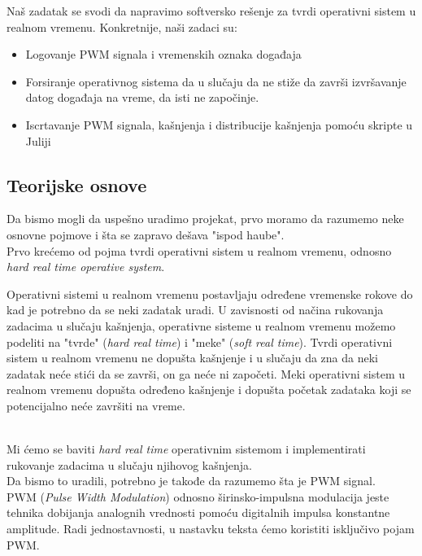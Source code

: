 \documentclass[a4paper, 11pt, titlepage]{article}
\begin{document}
Naš zadatak se svodi da napravimo softversko rešenje za tvrdi operativni sistem u realnom vremenu. 
Konkretnije, naši zadaci su: 
\begin{itemize}
  \item Logovanje PWM signala i vremenskih oznaka događaja
  \item Forsiranje operativnog sistema da u slučaju da ne stiže da završi izvršavanje datog događaja na vreme, da isti ne započinje.
  \item Iscrtavanje PWM signala, kašnjenja i distribucije kašnjenja pomoću skripte u Juliji

\end{itemize}


\subsection{Teorijske osnove}

Da bismo mogli da uspešno uradimo projekat, prvo moramo da razumemo neke osnovne pojmove i šta se zapravo dešava "ispod haube". 
\\

Prvo krećemo od pojma tvrdi operativni sistem u realnom vremenu, odnosno \textit{hard real time operative system}. 

Operativni sistemi u realnom vremenu postavljaju određene vremenske rokove do kad je potrebno da se neki zadatak uradi. U zavisnosti od načina rukovanja zadacima u slučaju kašnjenja, operativne sisteme u realnom vremenu možemo podeliti na "tvrde" (\textit{hard real time}) i "meke" (\textit{soft real time}). 
Tvrdi operativni sistem u realnom vremenu ne dopušta kašnjenje i u slučaju da zna da neki zadatak neće stići da se završi, on ga neće ni započeti. 
Meki operativni sistem u realnom vremenu dopušta određeno kašnjenje i dopušta početak zadataka koji se potencijalno neće završiti na vreme. 

\\

Mi ćemo se baviti \textit{hard real time} operativnim sistemom i implementirati rukovanje zadacima u slučaju njihovog kašnjenja. 
\\

Da bismo to uradili, potrebno je takođe da razumemo šta je PWM signal. 
\\
PWM (\textit{Pulse Width Modulation}) odnosno širinsko-impulsna modulacija jeste tehnika dobijanja analognih vrednosti pomoću digitalnih impulsa konstantne amplitude. Radi jednostavnosti, u nastavku teksta ćemo koristiti isključivo pojam PWM. 
\end{document}
